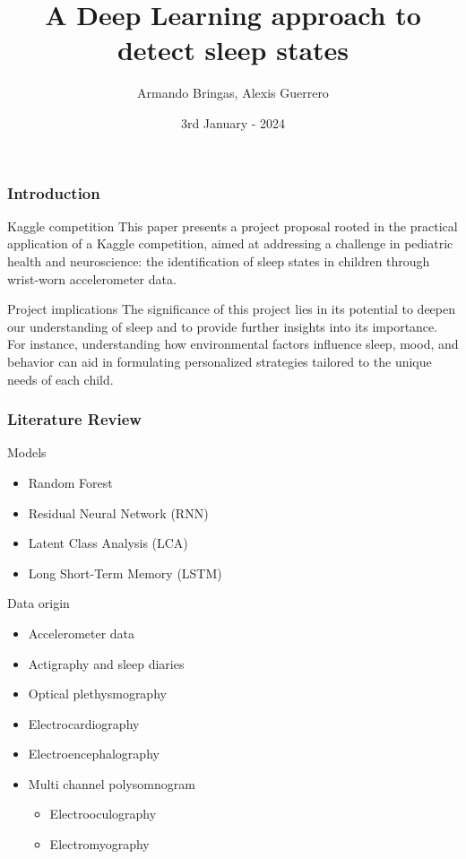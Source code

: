 \documentclass[10pt]{beamer}
\title{\Huge{A Deep Learning approach to detect sleep states}}
\author{Armando Bringas, Alexis Guerrero}
\date{3rd January - 2024}
\begin{document}
\begin{frame}
  \titlepage
\end{frame}

\begin{frame}
  \frametitle{Introduction}
  \begin{block}{Kaggle competition}
    This paper presents a project proposal rooted in the practical application of a Kaggle competition,
aimed at addressing a challenge in pediatric health and neuroscience: the identification of sleep states
in children through wrist-worn accelerometer data.
  \end{block}
  \begin{block}{Project implications}
    The significance of this project lies in its potential to deepen our understanding of sleep and to provide
further insights into its importance. For instance, understanding how environmental factors influence
sleep, mood, and behavior can aid in formulating personalized strategies tailored to the unique needs
of each child.
  \end{block} 
\end{frame}

\begin{frame}
  \frametitle{Literature Review}
  \begin{block}{Models}
    \begin{itemize}
    \item Random Forest
    \item Residual Neural Network (RNN)
    \item Latent Class Analysis (LCA)
    \item Long Short-Term Memory (LSTM)
    \end{itemize}
  \end{block}
  \begin{block}{Data origin}
    \begin{itemize}
    \item Accelerometer data
    \item Actigraphy and sleep diaries
    \item Optical plethysmography
    \item Electrocardiography
    \item Electroencephalography
    \item Multi channel polysomnogram
      \begin{itemize}
      \item Electrooculography
      \item Electromyography
      \end{itemize}
    \end{itemize}
  \end{block} 
\end{frame}
\end{document}
